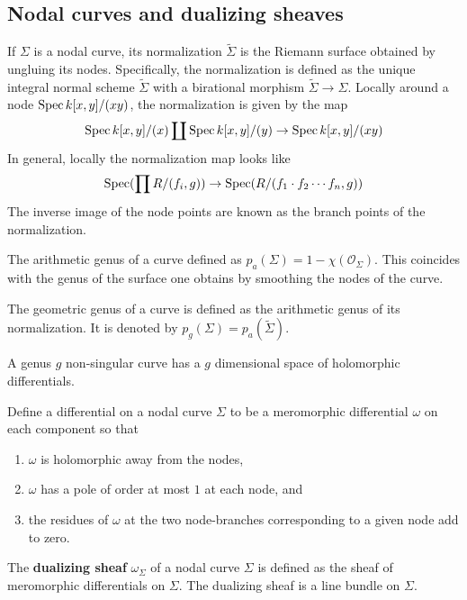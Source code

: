 \documentclass[12pt]{article}
\begin{document}
\subsection{Nodal curves and dualizing sheaves}
\begin{definition}
    If $\Sigma$ is a nodal curve, its normalization $\tilde \Sigma$ is the Riemann surface obtained by ungluing its nodes. Specifically, the normalization is defined as the unique integral normal scheme $\tilde \Sigma$ with a birational morphism $\tilde \Sigma \to \Sigma$. Locally around a node $\operatorname{Spec} k[x,y]/(xy)$, the normalization is given by the map \begin{align*}
        \operatorname{Spec} k[x,y]/(x) \coprod \operatorname{Spec} k[x,y]/(y) \to \operatorname{Spec} k[x,y]/(xy)
    \end{align*}
In general, locally the normalization map looks like \begin{align*}
    \operatorname{Spec}(\prod R/(f_i,g)) \to \operatorname{Spec}(R/(f_1\cdot f_2 \cdots f_n, g))
\end{align*}
The inverse image of the node points are known as the branch points of the normalization.
\end{definition}

\begin{definition}
    The arithmetic genus of a curve defined as $p_a(\Sigma) = 1 - \chi(\mathcal{O}_\Sigma)$. This coincides with the genus of the surface one obtains by smoothing the nodes of the curve. 

    The geometric genus of a curve is defined as the arithmetic genus of its normalization. It is denoted by $p_g(\Sigma) = p_a(\tilde \Sigma)$.
\end{definition}

A genus $g$ non-singular curve has a $g$ dimensional space of holomorphic differentials. 
\begin{definition}
    Define a differential on a nodal curve $\Sigma$ to be a meromorphic differential $\omega$ on each component so that \begin{enumerate}
        \item $\omega$ is holomorphic away from the nodes,
        \item $\omega$ has a pole of order at most $1$ at each node, and
        \item the residues of $\omega$ at the two node-branches corresponding to a given node add to zero.
    \end{enumerate}
\end{definition}
\begin{definition}
    
The \textbf{dualizing sheaf} $\omega_\Sigma$ of a nodal curve $\Sigma$ is defined as the sheaf of meromorphic differentials on $\Sigma$. The dualizing sheaf is a line bundle on $\Sigma$.

\end{definition}
\end{document}
